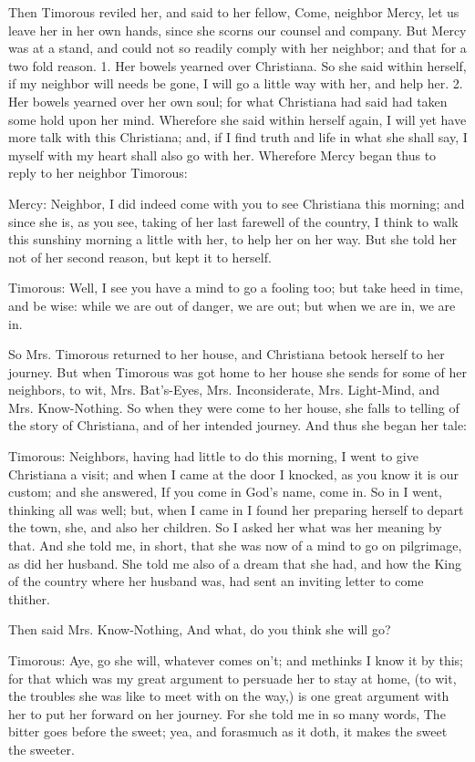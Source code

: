 Then Timorous reviled her, and said to her fellow, Come, neighbor Mercy, let us leave her in her own hands, since she scorns our counsel and company. But Mercy was at a stand, and could not so readily comply with her neighbor; and that for a two fold reason. 1. Her bowels yearned over Christiana. So she said within herself, if my neighbor will needs be gone, I will go a little way with her, and help her. 2. Her bowels yearned over her own soul; for what Christiana had said had taken some hold upon her mind. Wherefore she said within herself again, I will yet have more talk with this Christiana; and, if I find truth and life in what she shall say, I myself with my heart shall also go with her. Wherefore Mercy began thus to reply to her neighbor Timorous:

Mercy: Neighbor, I did indeed come with you to see Christiana this morning; and since she is, as you see, taking of her last farewell of the country, I think to walk this sunshiny morning a little with her, to help her on her way. But she told her not of her second reason, but kept it to herself.

Timorous: Well, I see you have a mind to go a fooling too; but take heed in time, and be wise: while we are out of danger, we are out; but when we are in, we are in.

So Mrs. Timorous returned to her house, and Christiana betook herself to her journey. But when Timorous was got home to her house she sends for some of her neighbors, to wit, Mrs. Bat's-Eyes, Mrs. Inconsiderate, Mrs. Light-Mind, and Mrs. Know-Nothing. So when they were come to her house, she falls to telling of the story of Christiana, and of her intended journey. And thus she began her tale:

Timorous: Neighbors, having had little to do this morning, I went to give Christiana a visit; and when I came at the door I knocked, as you know it is our custom; and she answered, If you come in God's name, come in. So in I went, thinking all was well; but, when I came in I found her preparing herself to depart the town, she, and also her children. So I asked her what was her meaning by that. And she told me, in short, that she was now of a mind to go on pilgrimage, as did her husband. She told me also of a dream that she had, and how the King of the country where her husband was, had sent an inviting letter to come thither.

Then said Mrs. Know-Nothing, And what, do you think she will go?

Timorous: Aye, go she will, whatever comes on't; and methinks I know it by this; for that which was my great argument to persuade her to stay at home, (to wit, the troubles she was like to meet with on the way,) is one great argument with her to put her forward on her journey. For she told me in so many words, The bitter goes before the sweet; yea, and forasmuch as it doth, it makes the sweet the sweeter.

